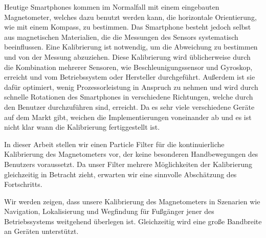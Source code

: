 Heutige Smartphones kommen im Normalfall mit einem eingebauten Magnetometer, welches dazu benutzt werden kann, die horizontale Orientierung, wie mit einem Kompass, zu bestimmen. Das Smartphone besteht jedoch selbst aus magnetischen Materialien, die die Messungen des Sensors systematisch beeinflussen. Eine Kalibrierung ist notwendig, um die Abweichung zu bestimmen und von der Messung abzuziehen. Diese Kalibrierung wird üblicherweise durch die Kombination mehrerer Sensoren, wie Beschleunigungssensor und Gyroskop, erreicht und vom Betriebssystem oder Hersteller durchgeführt. Außerdem ist sie dafür optimiert, wenig Prozessorleistung in Anspruch zu nehmen und wird durch schnelle Rotationen des Smartphones in verschiedene Richtungen, welche durch den Benutzer durchzuführen sind, erreicht. Da es sehr viele verschiedene Geräte auf dem Markt gibt, weichen die Implementierungen voneinander ab und es ist nicht klar wann die Kalibrierung fertiggestellt ist.

In dieser Arbeit stellen wir einen Particle Filter für die kontinuierliche Kalibrierung des Magnetometers vor, der keine besonderen Handbewegungen des Benutzers voraussetzt. Da unser Filter mehrere Möglichkeiten der Kalibrierung gleichzeitig in Betracht zieht, erwarten wir eine sinnvolle Abschätzung des Fortschritts.

Wir werden zeigen, dass unsere Kalibrierung des Magnetometers in Szenarien wie Navigation, Lokalisierung und Wegfindung für Fußgänger jener des Betriebssystems weitgehend überlegen ist. Gleichzeitig wird eine große Bandbreite an Geräten unterstützt.
